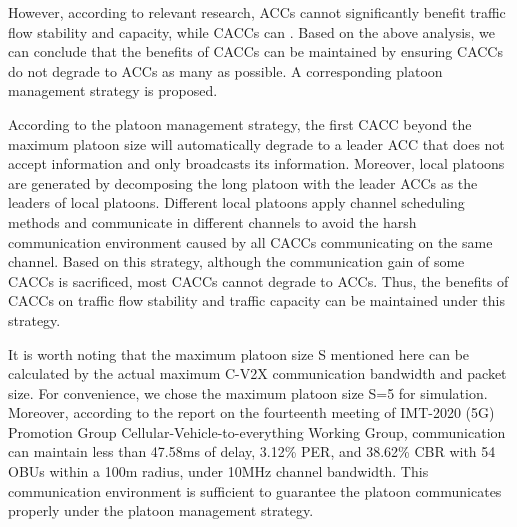 \documentclass[journal]{IEEEtran}
\begin{document}
However, according to relevant research, ACCs cannot significantly benefit traffic flow stability and capacity, while CACCs can \citep{Shang2021,Shladover2012,Nikolos2015}. Based on the above analysis, we can conclude that the benefits of CACCs can be maintained by ensuring CACCs do not degrade to ACCs as many as possible. A corresponding platoon management strategy is proposed.


According to the platoon management strategy, the first CACC beyond the maximum platoon size will automatically degrade to a leader ACC that does not accept information and only broadcasts its information. Moreover, local platoons are generated by decomposing the long platoon with the leader ACCs as the leaders of local platoons. Different local platoons apply channel scheduling methods and communicate in different channels to avoid the harsh communication environment caused by all CACCs communicating on the same channel. Based on this strategy, although the communication gain of some CACCs is sacrificed, most CACCs cannot degrade to ACCs. Thus, the benefits of CACCs on traffic flow stability and traffic capacity can be maintained under this strategy.

It is worth noting that the maximum platoon size S mentioned here can be calculated by the actual maximum C-V2X communication bandwidth and packet size. For convenience, we chose the maximum platoon size S=5 for simulation. Moreover, according to the report on the fourteenth meeting of IMT-2020 (5G) Promotion Group Cellular-Vehicle-to-everything Working Group, communication can maintain less than 47.58ms of delay, 3.12\% PER, and 38.62\% CBR with 54 OBUs within a 100m radius, under 10MHz channel bandwidth. This communication environment is sufficient to guarantee the platoon communicates properly under the platoon management strategy.


\ifCLASSOPTIONcaptionsoff
  \newpage
\fi





%
%
\end{document}
